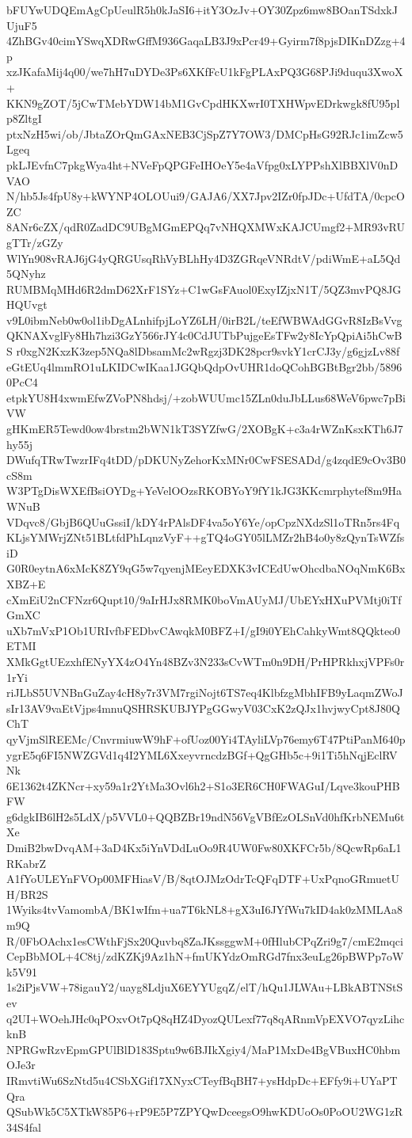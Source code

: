 bFUYwUDQEmAgCpUeulR5h0kJaSI6+itY3OzJv+OY30Zpz6mw8BOanTSdxkJUjuF5
4ZhBGv40cimYSwqXDRwGffM936GaqaLB3J9xPcr49+Gyirm7f8pjsDIKnDZzg+4p
xzJKafaMij4q00/we7hH7uDYDe3Ps6XKfFcU1kFgPLAxPQ3G68PJi9duqu3XwoX+
KKN9gZOT/5jCwTMebYDW14bM1GvCpdHKXwrI0TXHWpvEDrkwgk8fU95plp8ZltgI
ptxNzH5wi/ob/JbtaZOrQmGAxNEB3CjSpZ7Y7OW3/DMCpHsG92RJc1imZcw5Lgeq
pkLJEvfnC7pkgWya4ht+NVeFpQPGFeIHOeY5e4aVfpg0xLYPPshXlBBXlV0nDVAO
N/hb5Js4fpU8y+kWYNP4OLOUui9/GAJA6/XX7Jpv2IZr0fpJDc+UfdTA/0cpcOZC
8ANr6cZX/qdR0ZadDC9UBgMGmEPQq7vNHQXMWxKAJCUmgf2+MR93vRUgTTr/zGZy
WlYn908vRAJ6jG4yQRGUsqRhVyBLhHy4D3ZGRqeVNRdtV/pdiWmE+aL5Qd5QNyhz
RUMBMqMHd6R2dmD62XrF1SYz+C1wGsFAuol0ExyIZjxN1T/5QZ3mvPQ8JGHQUvgt
v9L0ibmNeb0w0ol1ibDgALnhifpjLoYZ6LH/0irB2L/teEfWBWAdGGvR8IzBsVvg
QKNAXvglFy8Hh7hzi3GzY566rJY4c0CdJUTbPujgeEsTFw2y8IcYpQpiAi5hCwBS
r0xgN2KxzK3zep5NQa8lDbsamMc2wRgzj3DK28pcr9svkY1crCJ3y/g6gjzLv88f
eGtEUq4lmmRO1uLKIDCwIKaa1JGQbQdpOvUHR1doQCohBGBtBgr2bb/58960PcC4
etpkYU8H4xwmEfwZVoPN8hdsj/+zobWUUmc15ZLn0duJbLLus68WeV6pwc7pBiVW
gHKmER5Tewd0ow4brstm2bWN1kT3SYZfwG/2XOBgK+c3a4rWZnKsxKTh6J7hy55j
DWufqTRwTwzrIFq4tDD/pDKUNyZehorKxMNr0CwFSESADd/g4zqdE9cOv3B0cS8m
W3PTgDisWXEfBsiOYDg+YeVelOOzsRKOBYoY9fY1kJG3KKcmrphytef8m9HaWNuB
VDqvc8/GbjB6QUuGssiI/kDY4rPAlsDF4va5oY6Ye/opCpzNXdzSl1oTRn5rs4Fq
KLjsYMWrjZNt51BLtfdPhLqnzVyF++gTQ4oGY05lLMZr2hB4o0y8zQynTsWZfsiD
G0R0eytnA6xMcK8ZY9qG5w7qyenjMEeyEDXK3vICEdUwOhcdbaNOqNmK6BxXBZ+E
cXmEiU2nCFNzr6Qupt10/9aIrHJx8RMK0boVmAUyMJ/UbEYxHXuPVMtj0iTfGmXC
uXb7mVxP1Ob1URIvfbFEDbvCAwqkM0BFZ+I/gI9i0YEhCahkyWmt8QQkteo0ETMI
XMkGgtUEzxhfENyYX4zO4Yn48BZv3N233sCvWTm0n9DH/PrHPRkhxjVPFs0r1rYi
riJLbS5UVNBnGuZay4cH8y7r3VM7rgiNojt6TS7eq4KlbfzgMbhIFB9yLaqmZWoJ
sIr13AV9vaEtVjps4mnuQSHRSKUBJYPgGGwyV03CxK2zQJx1hvjwyCpt8J80QChT
qyVjmSlREEMc/CnvrmiuwW9hF+ofUoz00Yi4TAyliLVp76emy6T47PtiPanM640p
ygrE5q6FI5NWZGVd1q4I2YML6XxeyvrncdzBGf+QgGHb5c+9i1Ti5hNqjEclRVNk
6E1362t4ZKNcr+xy59a1r2YtMa3Ovl6h2+S1o3ER6CH0FWAGuI/Lqve3kouPHBFW
g6dgkIB6lH2s5LdX/p5VVL0+QQBZBr19ndN56VgVBfEzOLSnVd0hfKrbNEMu6tXe
DmiB2bwDvqAM+3aD4Kx5iYnVDdLuOo9R4UW0Fw80XKFCr5b/8QcwRp6aL1RKabrZ
A1fYoULEYnFVOp00MFHiasV/B/8qtOJMzOdrTcQFqDTF+UxPqnoGRmuetUH/BR2S
1Wyiks4tvVamombA/BK1wIfm+ua7T6kNL8+gX3uI6JYfWu7kID4ak0zMMLAa8m9Q
R/0FbOAchx1esCWthFjSx20Quvbq8ZaJKssggwM+0fHlubCPqZri9g7/cmE2mqci
CepBbMOL+4C8tj/zdKZKj9Az1hN+fmUKYdzOmRGd7fnx3euLg26pBWPp7oWk5V91
1s2iPjsVW+78igauY2/uayg8LdjuX6EYYUgqZ/elT/hQu1JLWAu+LBkABTNStSev
q2UI+WOehJHc0qPOxvOt7pQ8qHZ4DyozQULexf77q8qARnmVpEXVO7qyzLihcknB
NPRGwRzvEpmGPUlBlD183Sptu9w6BJIkXgiy4/MaP1MxDe4BgVBuxHC0hbmOJe3r
IRmvtiWu6SzNtd5u4CSbXGif17XNyxCTeyfBqBH7+ysHdpDc+EFfy9i+UYaPTQra
QSubWk5C5XTkW85P6+rP9E5P7ZPYQwDceegsO9hwKDUoOs0PoOU2WG1zR34S4fal
